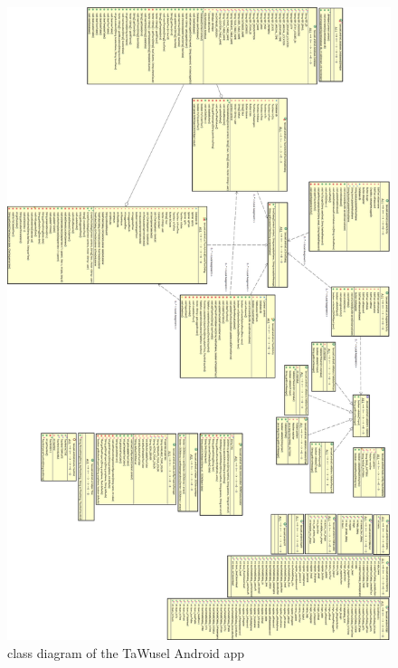 \begin{figure}[h]
	\centering
	\includegraphics[height=.9\textheight]{images/Tawuseldroid_class}
	\caption{class diagram of the TaWusel Android app}
	\label{img:AndCl}
\end{figure}

